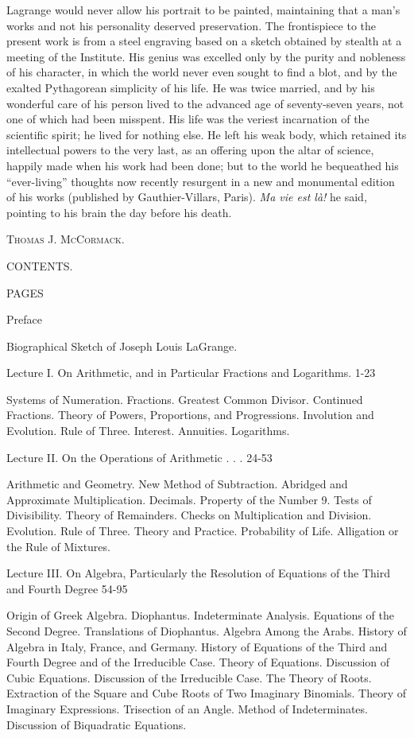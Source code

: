 \documentclass[12pt]{book}[2005/09/16]
\renewcommand{\cleardoublepage}{\clearpage}
\newcommand{\FlushRunningHeads}{\clearpage\fancyhf{}\cleardoublepage}
\newcommand{\InitRunningHeads}{%
  \setlength{\headheight}{15pt}
  \pagestyle{fancy}
  \thispagestyle{empty}
  \ifthenelse{\boolean{ForPrinting}}
             {\fancyhead[RO,LE]{\thepage}}
             {\fancyhead[R]{\thepage}}
}
\newcommand{\SetRunningHeads}[1]{%
  \fancyhead[C]{\textsc{\MakeLowercase{#1}}}
}
\newcommand{\BookMark}[2]{\phantomsection\pdfbookmark[#1]{#2}{#2}}
\newcommand{\TableofContents}{%
  \FlushRunningHeads
  \InitRunningHeads
  \SetRunningHeads{Contents.}
  \BookMark{0}{Contents.}
  \tableofcontents
}
\newcommand{\Signature}[2]{%
  \medskip%
  \null\hfill\textsc{#1}\hspace*{\parindent} \\
  \hspace*{\parindent}#2%
}
\newcommand{\PageSep}[1]{\ignorespaces}
\begin{document}
Lagrange would never allow his portrait to be painted, maintaining
that a man's works and not his personality deserved preservation.
The frontispiece to the present work is from a steel
engraving based on a sketch obtained by stealth at a meeting of
the Institute. His genius was excelled only by the purity and
nobleness of his character, in which the world never even sought
\PageSep{xiii}
to find a blot, and by the exalted Pythagorean simplicity of his
life. He was twice married, and by his wonderful care of his person
lived to the advanced age of seventy-seven years, not one of
which had been misspent. His life was the veriest incarnation of
the scientific spirit; he lived for nothing else. He left his weak
body, which retained its intellectual powers to the very last, as an
offering upon the altar of science, happily made when his work
had been done; but to the world he bequeathed his ``ever-living''
thoughts now recently resurgent in a new and monumental edition
of his works (published by Gauthier-Villars, Paris). \textit{Ma vie est
là!} he said, pointing to his brain the day before his death.

\Signature{Thomas J. McCormack.}{}
\PageSep{xiv}
\PageSep{xv}
\TableofContents
\iffalse
CONTENTS.

PAGES

Preface

Biographical Sketch of Joseph Louis LaGrange.

Lecture I. On Arithmetic, and in Particular Fractions
and Logarithms. 1-23

Systems of Numeration. Fractions. Greatest Common
Divisor. Continued Fractions. Theory of
Powers, Proportions, and Progressions. Involution
and Evolution. Rule of Three. Interest. Annuities.
Logarithms.

Lecture II. On the Operations of Arithmetic . . . 24-53

Arithmetic and Geometry. New Method of Subtraction.
Abridged and Approximate Multiplication.
Decimals. Property of the Number 9.
Tests of Divisibility. Theory of Remainders.
Checks on Multiplication and Division. Evolution.
Rule of Three. Theory and Practice. Probability
of Life. Alligation or the Rule of Mixtures.

Lecture III. On Algebra, Particularly the Resolution
of Equations of the Third and Fourth Degree 54-95

Origin of Greek Algebra. Diophantus. Indeterminate
Analysis. Equations of the Second Degree.
Translations of Diophantus. Algebra Among the
Arabs. History of Algebra in Italy, France, and
Germany. History of Equations of the Third and
Fourth Degree and of the Irreducible Case. Theory
of Equations. Discussion of Cubic Equations.
Discussion of the Irreducible Case. The Theory
\PageSep{xvi}
of Roots. Extraction of the Square and Cube Roots
of Two Imaginary Binomials. Theory of Imaginary
Expressions. Trisection of an Angle. Method
of Indeterminates. Discussion of Biquadratic Equations.
\end{document}
